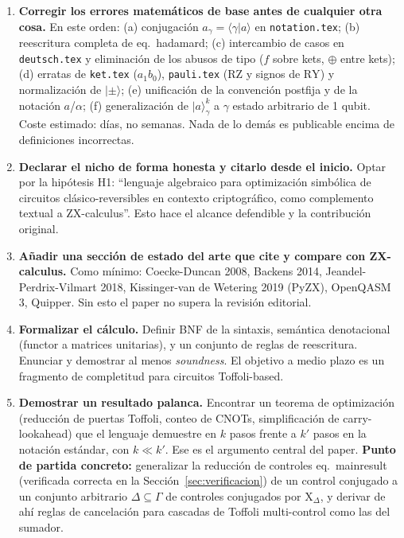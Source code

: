 \documentclass[12pt, a4paper]{article}
\newcommand{\gate}[1]{\text{#1}}
\newcommand{\stateket}[3]{\ket{#1}^{#2}_{#3}}
\newcommand{\ket}[1]{|#1\rangle}
\newcommand{\braket}[2]{\langle #1|#2\rangle}
\begin{document}
\begin{enumerate}[label=\textbf{R\arabic*.}, start=0]

  \item \textbf{Corregir los errores matemáticos de base antes de
          cualquier otra cosa.}
        En este orden: (a) conjugación $a_\gamma=\braket{\gamma}{a}$ en
        \texttt{notation.tex}; (b) reescritura completa de eq.~hadamard;
        (c) intercambio de casos en \texttt{deutsch.tex} y eliminación de los
        abusos de tipo ($f$ sobre kets, $\oplus$ entre kets); (d) erratas de
        \texttt{ket.tex} ($a_1b_0$), \texttt{pauli.tex} ($\gate{RZ}$ y signos
        de $\gate{RY}$) y normalización de $\ket{\pm}$; (e) unificación de la convención
        postfija y de la notación $a$/$\alpha$; (f) generalización de
        $\stateket{a}{k}{\gamma}$ a $\gamma$ estado arbitrario de 1 qubit.
        Coste estimado: días, no semanas. Nada de lo demás es publicable
        encima de definiciones incorrectas.

  \item \textbf{Declarar el nicho de forma honesta y citarlo desde el
          inicio.}
        Optar por la hipótesis H1: ``lenguaje algebraico para optimización
        simbólica de circuitos clásico-reversibles en contexto criptográfico,
        como complemento textual a ZX-calculus''. Esto hace el alcance
        defendible y la contribución original.

  \item \textbf{Añadir una sección de estado del arte que cite y compare
          con ZX-calculus.}
        Como mínimo: Coecke-Duncan 2008, Backens 2014,
        Jeandel-Perdrix-Vilmart 2018, Kissinger-van de Wetering 2019 (PyZX),
        OpenQASM 3, Quipper.
        Sin esto el paper no supera la revisión editorial.

  \item \textbf{Formalizar el cálculo.}
        Definir BNF de la sintaxis, semántica denotacional (functor a
        matrices unitarias), y un conjunto de reglas de reescritura. Enunciar
        y demostrar al menos \emph{soundness}. El objetivo a medio plazo es
        un fragmento de completitud para circuitos Toffoli-based.

  \item \textbf{Demostrar un resultado palanca.}
        Encontrar un teorema de optimización (reducción de puertas Toffoli,
        conteo de CNOTs, simplificación de carry-lookahead) que el lenguaje
        demuestre en $k$ pasos frente a $k'$ pasos en la notación estándar,
        con $k \ll k'$. Ese es el argumento central del paper.
        \textbf{Punto de partida concreto:} generalizar la reducción de
        controles eq.~mainresult (verificada correcta en la
        Sección~\ref{sec:verificacion}) de un control conjugado a un conjunto
        arbitrario $\Delta \subseteq \Gamma$ de controles conjugados por
        $\gate{X}_\Delta$, y derivar de ahí reglas de cancelación para
        cascadas de Toffoli multi-control como las del sumador.


\end{enumerate}
\end{document}

